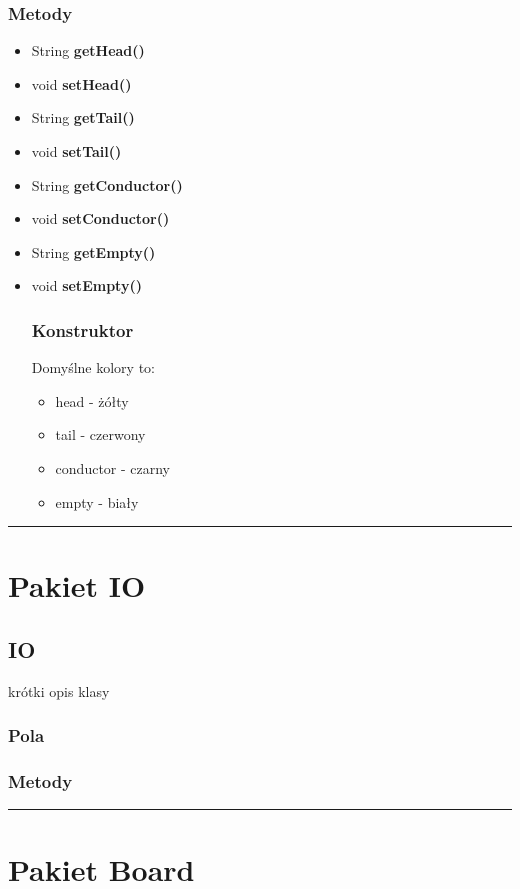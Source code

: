 \documentclass[a4paper,11pt]{article}
\newcommand{\linia}{\rule{\linewidth}{0.4mm}}
\begin{document}
\subsubsection{Metody}
\begin{itemize}
\item String \textbf{getHead()}
\item void \textbf{setHead()}
\item String \textbf{getTail()}
\item void \textbf{setTail()}
\item String \textbf{getConductor()}
\item void \textbf{setConductor()}
\item String \textbf{getEmpty()}
\item void \textbf{setEmpty()}
\subsubsection{Konstruktor}
Domyślne kolory to:
\begin{itemize}
\item head - żółty
\item tail - czerwony
\item conductor - czarny
\item empty - biały
\end{itemize}
\end{itemize}
\noindent\linia







\section{Pakiet IO}
\subsection{IO}
krótki opis klasy
\subsubsection{Pola}

\subsubsection{Metody}



\noindent\linia

\section{Pakiet Board}
\end{document}
